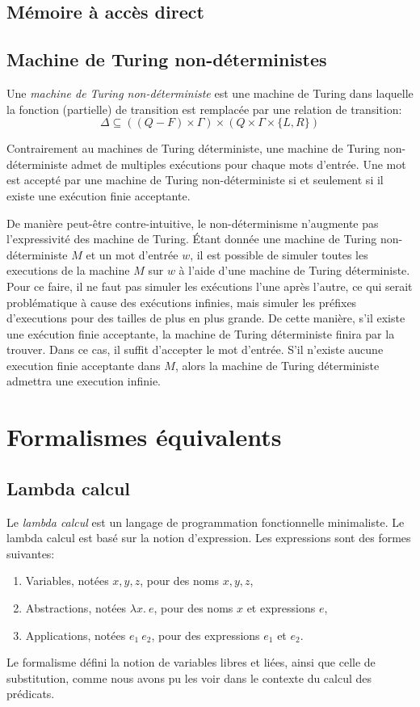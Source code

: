 \subsection{Mémoire à accès direct}

\subsection{Machine de Turing non-déterministes}

Une \og \textit{machine de Turing non-déterministe} \fg{} est une machine de Turing dans laquelle la fonction (partielle) de transition est remplacée par une relation de transition:
\[
\Delta \subseteq ((Q - F) \times \Gamma) \times (Q \times \Gamma \times \{L, R\})
\]

Contrairement au machines de Turing déterministe, une machine de Turing non-déterministe admet de multiples exécutions pour chaque mots d'entrée.
Une mot est accepté par une machine de Turing non-déterministe si et seulement si il existe une exécution finie acceptante.

De manière peut-être contre-intuitive, le non-déterminisme n'augmente pas l'expressivité des machine de Turing.
Étant donnée une machine de Turing non-déterministe $M$ et un mot d'entrée $w$, il est possible de simuler toutes les executions de la machine $M$ sur $w$ à l'aide d'une machine de Turing déterministe.
Pour ce faire, il ne faut pas simuler les exécutions l'une après l'autre, ce qui serait problématique à cause des exécutions infinies, mais simuler les préfixes d'executions pour des tailles de plus en plus grande.
De cette manière, s'il existe une exécution finie acceptante, la machine de Turing déterministe finira par la trouver.
Dans ce cas, il suffit d'accepter le mot d'entrée.
S'il n'existe aucune execution finie acceptante dans $M$, alors la machine de Turing déterministe admettra une execution infinie.

\section{Formalismes équivalents}

\subsection{Lambda calcul}

Le \og \textit{lambda calcul} \fg{} est un langage de programmation fonctionnelle minimaliste.
Le lambda calcul est basé sur la notion d'expression. Les expressions sont des formes suivantes:
\begin{enumerate}
\item Variables, notées $x, y, z$, pour des noms $x, y, z$,
\item Abstractions, notées $\lambda x. \ e$, pour des noms $x$ et expressions $e$,
\item Applications, notées $e_1\ e_2$, pour des expressions $e_1$ et $e_2$.
\end{enumerate}
Le formalisme défini la notion de variables libres et liées, ainsi que celle de substitution, comme nous avons pu les voir dans le contexte du calcul des prédicats.

